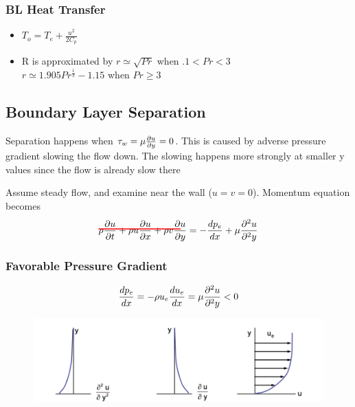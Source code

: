 \documentclass[a4paper]{article}
\begin{document}
    \subsubsection{BL Heat Transfer}
        \begin{itemize}
            \item $T_o = T_e + \frac{u^2}{2 C_p}$
            \item R is approximated by $r \simeq \sqrt{Pr}$ when $.1 < Pr < 3$ \\
            $r \simeq 1.905 Pr^\frac{1}{3} - 1.15$ when $Pr \geq 3$
        \end{itemize}

    \subsection{Boundary Layer Separation}
    Separation happens when $\tau_w = \mu \frac{\partial u}{\partial y} = 0$. This is caused by adverse pressure gradient 
    slowing the flow down. The slowing happens more strongly at smaller y values since the flow is already slow there

    Assume steady flow, and examine near the wall ($u = v= 0$). Momentum equation becomes
    \begin{equation*}
        \hcancel[red]{\rho \partderiv{u}{t}+ \rho u \partderiv{u}{x} + \rho v \partderiv{u}{y}} %
                = -\frac{dp_e}{dx} + \mu \partderivtwo{u}{y}
    \end{equation*}
    \subsubsection{Favorable Pressure Gradient}
    \begin{equation*}
        \frac{dp_e}{dx} = - \rho u_e  \frac{du_e}{dx} = \mu \frac{\partial^2 u}{\partial^2 y} < 0
    \end{equation*}
    \begin{figure}[H]
        \centering
        \includegraphics[width=.75\textwidth]{images/seperation_favorable_pg.png}
    \end{figure}
\end{document}
